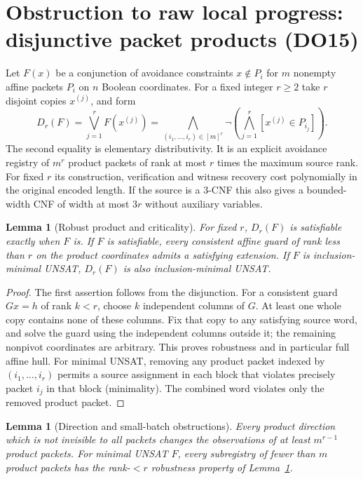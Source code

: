 \documentclass[11pt]{article}
\newtheorem{lemma}[theorem]{Lemma}
\begin{document}
\section{Obstruction to raw local progress: disjunctive packet products (DO15)}\label{sec:do15}
Let $F(x)$ be a conjunction of avoidance constraints $x\notin P_i$ for $m$ nonempty affine packets $P_i$ on $n$ Boolean coordinates. For a fixed integer $r\ge2$ take $r$ disjoint copies $x^{(j)}$, and form
\[
D_r(F)=\bigvee_{j=1}^r F(x^{(j)})
=\bigwedge_{(i_1,\ldots,i_r)\in[m]^r}
\neg\left(\bigwedge_{j=1}^r[x^{(j)}\in P_{i_j}]\right).
\]
The second equality is elementary distributivity. It is an explicit avoidance registry of $m^r$ product packets of rank at most $r$ times the maximum source rank. For fixed $r$ its construction, verification and witness recovery cost polynomially in the original encoded length. If the source is a 3-CNF this also gives a bounded-width CNF of width at most $3r$ without auxiliary variables.
\begin{lemma}[Robust product and criticality]\label{lem:robust}
For fixed $r$, $D_r(F)$ is satisfiable exactly when $F$ is. If $F$ is satisfiable, every consistent affine guard of rank less than $r$ on the product coordinates admits a satisfying extension. If $F$ is inclusion-minimal UNSAT, $D_r(F)$ is also inclusion-minimal UNSAT.
\end{lemma}
\begin{proof}
The first assertion follows from the disjunction. For a consistent guard $Gx=h$ of rank $k<r$, choose $k$ independent columns of $G$. At least one whole copy contains none of these columns. Fix that copy to any satisfying source word, and solve the guard using the independent columns outside it; the remaining nonpivot coordinates are arbitrary. This proves robustness and in particular full affine hull. For minimal UNSAT, removing any product packet indexed by $(i_1,\ldots,i_r)$ permits a source assignment in each block that violates precisely packet $i_j$ in that block (minimality). The combined word violates only the removed product packet.
\end{proof}
\begin{lemma}[Direction and small-batch obstructions]\label{lem:directions}
Every product direction which is not invisible to all packets changes the observations of at least $m^{r-1}$ product packets. For minimal UNSAT $F$, every subregistry of fewer than $m$ product packets has the rank-$<r$ robustness property of Lemma~\ref{lem:robust}.
\end{lemma}
\end{document}
